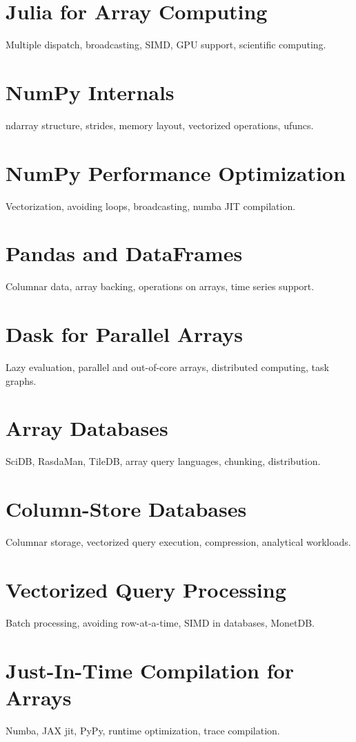 \chapter{Julia for Array Computing}
Multiple dispatch, broadcasting, SIMD, GPU support, scientific computing.

\chapter{NumPy Internals}
ndarray structure, strides, memory layout, vectorized operations, ufuncs.

\chapter{NumPy Performance Optimization}
Vectorization, avoiding loops, broadcasting, numba JIT compilation.

\chapter{Pandas and DataFrames}
Columnar data, array backing, operations on arrays, time series support.

\chapter{Dask for Parallel Arrays}
Lazy evaluation, parallel and out-of-core arrays, distributed computing, task graphs.

\chapter{Array Databases}
SciDB, RasdaMan, TileDB, array query languages, chunking, distribution.

\chapter{Column-Store Databases}
Columnar storage, vectorized query execution, compression, analytical workloads.

\chapter{Vectorized Query Processing}
Batch processing, avoiding row-at-a-time, SIMD in databases, MonetDB.

\chapter{Just-In-Time Compilation for Arrays}
Numba, JAX jit, PyPy, runtime optimization, trace compilation.

